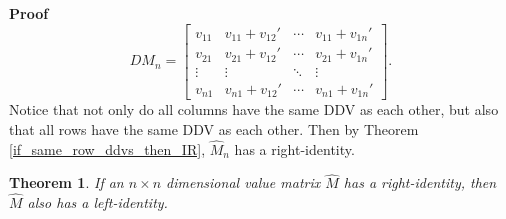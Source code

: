 \documentclass[10pt,letterpaper]{article}
\newtheorem{thm}{Theorem}[section]
\newenvironment{proof}{\noindent\textbf{Proof} }{\qed \newline}
\newcommand{\qed}{\nobreak \ifvmode \relax \else
      \ifdim\lastskip<1.5em \hskip-\lastskip
      \hskip1.5em plus0em minus0.5em \fi \nobreak
      \vrule height0.75em width0.5em depth0.25em\fi}
\numberwithin{equation}{section}
\begin{document}
\begin{proof}
\[ DM_n = \left[ \begin{matrix} 
  v_{11} & v_{11} + v_{12} \prime & \cdots & v_{11} + v_{1n} \prime \\
  v_{21} & v_{21} + v_{12} \prime & \cdots & v_{21} + v_{1n} \prime \\
  \vdots & \vdots & \ddots & \vdots \\
  v_{n1} & v_{n1} + v_{12} \prime & \cdots & v_{n1} + v_{1n} \prime
\end{matrix} \right] . \] Notice that not only do all columns have the
same DDV as each other, but also that all rows have the same DDV as
each other.  Then by Theorem \ref{if_same_row_ddvs_then_IR}, $\hat
M_n$ has a right-identity.\end{proof}

\begin{thm}If an $n \times n$ dimensional value matrix $\hat M$  has a
  right-identity, then $\hat M$ also has a left-identity.\end{thm}
\end{document}
